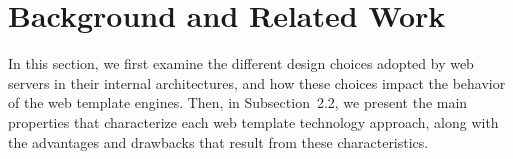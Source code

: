 \section{Background and Related Work}

In this section, we first examine the different design choices adopted by web
servers in their internal architectures, and how these choices impact the
behavior of the web template engines. Then, in Subsection~2.2, we present the
main properties that characterize each web template technology approach, along
with the advantages and drawbacks that result from these characteristics.


